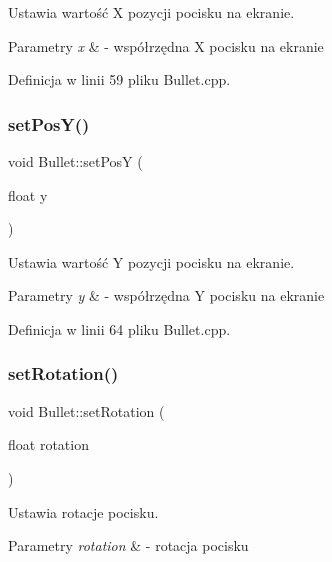 Ustawia wartość X pozycji pocisku na ekranie. 


\begin{DoxyParams}{Parametry}
{\em x} & -\/ współrzędna X pocisku na ekranie \\
\hline
\end{DoxyParams}


Definicja w linii 59 pliku Bullet.\+cpp.

\mbox{\label{class_bullet_a600b82ffa52d709ac44db182a2b02c78}} 
\subsubsection{\texorpdfstring{set\+Pos\+Y()}{setPosY()}}
{\footnotesize\ttfamily void Bullet\+::set\+PosY (\begin{DoxyParamCaption}\item[{float}]{y }\end{DoxyParamCaption})}



Ustawia wartość Y pozycji pocisku na ekranie. 


\begin{DoxyParams}{Parametry}
{\em y} & -\/ współrzędna Y pocisku na ekranie \\
\hline
\end{DoxyParams}


Definicja w linii 64 pliku Bullet.\+cpp.

\mbox{\label{class_bullet_ad80b48a0ec4a81fad7e8fce823be2663}} 
\subsubsection{\texorpdfstring{set\+Rotation()}{setRotation()}}
{\footnotesize\ttfamily void Bullet\+::set\+Rotation (\begin{DoxyParamCaption}\item[{float}]{rotation }\end{DoxyParamCaption})}



Ustawia rotacje pocisku. 


\begin{DoxyParams}{Parametry}
{\em rotation} & -\/ rotacja pocisku \\
\hline
\end{DoxyParams}


